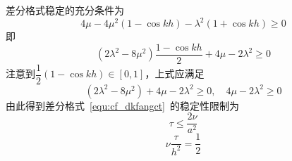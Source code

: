 \documentclass[xcolor=dvipsnames]{beamer}
\begin{document}
\begin{frame}
差分格式稳定的充分条件为
\begin{equation}
4\mu-4\mu^2(1-\cos kh)-\lambda^2(1+\cos kh) \geq 0
\end{equation}
即
\begin{equation}
(2\lambda^2-8\mu^2)\dfrac{1-\cos kh}{2}+4\mu-2\lambda^2 \geq 0
\end{equation}
注意到$\dfrac{1}{2}(1-\cos kh)\in[0,1]$，上式应满足
\begin{equation}
(2\lambda^2-8\mu^2)+4\mu-2\lambda^2 \geq 0,\quad 4\mu-2\lambda^2 \geq 0
\end{equation}
由此得到差分格式~\ref{equ:cf_dkfangct}~的稳定性限制为
\begin{equation}
\tau \leq \dfrac{2\nu}{a^2}
\end{equation}
\begin{equation}
\nu\dfrac{\tau}{h^2}=\dfrac{1}{2}
\end{equation}\par
\end{frame}
\end{document}
